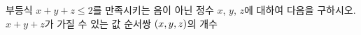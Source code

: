 부등식 $x+y+z\le 2$를 만족시키는 음이 아닌 정수 $x$, $y$, $z$에 대하여 다음을 구하시오.
 $x+y+z$가 가질 수 있는 값
 순서쌍 $(x{,}\mkern3mu\mathopen{}y{,}\mkern3mu\mathopen{}z)$의 개수
